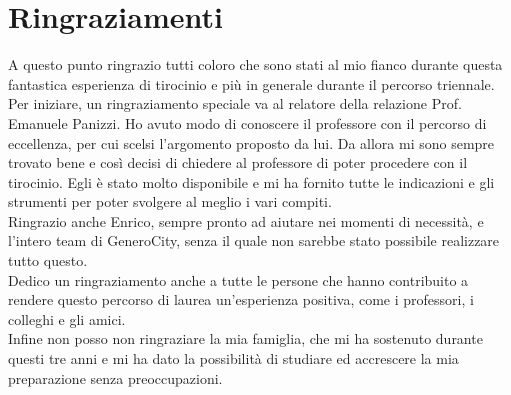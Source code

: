 \chapter*{Ringraziamenti}
A questo punto ringrazio tutti coloro che sono stati
al mio fianco durante questa fantastica esperienza
di tirocinio e più in generale durante il percorso 
triennale.\\
Per iniziare, un ringraziamento speciale va al relatore della
relazione Prof. Emanuele Panizzi. Ho avuto modo di conoscere il
professore con il percorso di eccellenza, per cui scelsi l'argomento 
proposto da lui. Da allora mi sono sempre trovato bene e
così decisi di chiedere al professore di poter procedere con il
tirocinio. Egli è stato molto disponibile e mi ha fornito tutte le
indicazioni e gli strumenti per poter svolgere al meglio i vari compiti.\\
Ringrazio anche Enrico, sempre pronto ad aiutare nei momenti di necessità, 
e l'intero team di GeneroCity, senza il quale non sarebbe stato possibile
realizzare tutto questo.\\
Dedico un ringraziamento anche a tutte le persone che hanno contribuito a
rendere questo percorso di laurea un'esperienza positiva, come i professori,
i colleghi e gli amici.\\
Infine non posso non ringraziare la mia famiglia, che mi ha sostenuto durante
questi tre anni e mi ha dato la possibilità di studiare ed accrescere la mia
preparazione senza preoccupazioni.
